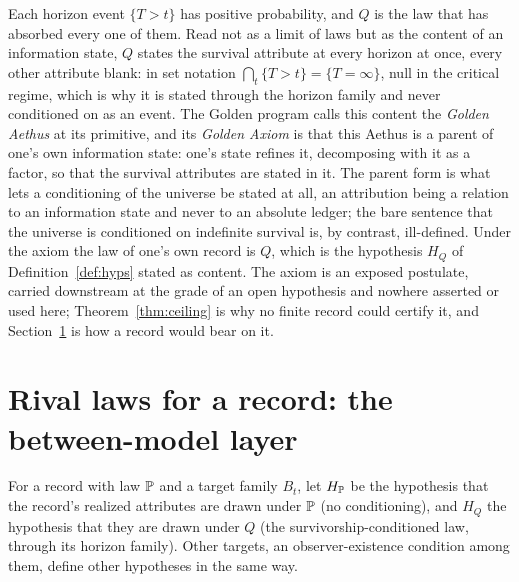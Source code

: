 \begin{remark}
\label{rem:goldenaxiom}
Each horizon event $\{T>t\}$ has positive probability, and $Q$ is the
law that has absorbed every one of them. Read not as a limit of laws
but as the content of an information state, $Q$ states the survival
attribute at every horizon at once, every other attribute blank: in set
notation $\bigcap_t\{T>t\}=\{T=\infty\}$, null in the critical regime,
which is why it is stated through the horizon family and never
conditioned on as an event. The Golden program calls this content the
\emph{Golden Aethus} at its primitive, and its \emph{Golden Axiom} is
that this Aethus is a parent of one's own information state: one's
state refines it, decomposing with it as a factor, so that the survival
attributes are stated in it. The parent form is what lets a conditioning
of the universe be stated at all, an attribution being a relation to an
information state and never to an absolute ledger; the bare sentence
that the universe is conditioned on indefinite survival is, by
contrast, ill-defined. Under the axiom the law of one's own record is
$Q$, which is the hypothesis $H_Q$ of Definition~\ref{def:hyps} stated
as content. The axiom is an exposed postulate, carried downstream at the
grade of an open hypothesis and nowhere asserted or used here;
Theorem~\ref{thm:ceiling} is why no finite record could certify it, and
Section~\ref{sec:models} is how a record would bear on it.
\end{remark}

\section{Rival laws for a record: the between-model layer}
\label{sec:models}

\begin{definition}\label{def:hyps}
For a record with law $\mathbb{P}$ and a target family $B_t$, let $H_{\mathbb{P}}$ be the
hypothesis that the record's realized attributes are drawn under $\mathbb{P}$
(no conditioning), and $H_Q$ the hypothesis that they are drawn under
$Q$ (the survivorship-conditioned law, through its horizon family). Other
targets, an observer-existence condition among them, define other
hypotheses in the same way.
\end{definition}

